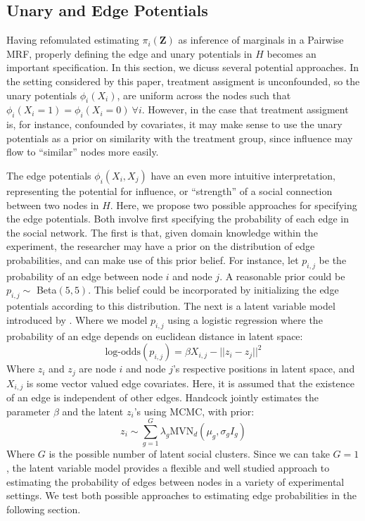 \documentclass{article}
\begin{document}
\subsection{Unary and Edge Potentials}

Having refomulated estimating $\pi_i(\mathbf{Z})$ as inference of marginals in a Pairwise MRF, 
properly defining the edge and unary potentials in $H$ becomes an important specification. In this section, 
we dicuss several potential approaches. In the setting considered by this paper, treatment assigment is unconfounded, so 
the unary potentials $\phi_i(X_i)$, are uniform across the nodes such that $\phi_i(X_i = 1) = \phi_i(X_i = 0) \ \forall i$. However, 
in the case that treatment assigment is, for instance, confounded by covariates, it may make sense to use the unary potentials as a prior on similarity 
with the treatment group, since influence may flow to ``similar'' nodes more easily. 

The edge potentials $\phi_i(X_i, X_j)$ have an even more intuitive interpretation, representing the potential for influence, or ``strength'' of a social connection between two nodes in $H$. Here, 
we propose two possible approaches for specifying the edge potentials. Both involve first specifying the probability of each edge in the social network. The first is that, given domain knowledge within the experiment, the researcher may have a prior on the distribution of 
edge probabilities, and can make use of this prior belief. For instance, let $p_{i,j}$ be the probability of an edge between node 
$i$ and node $j$. A reasonable prior could be $p_{i,j} \sim $ Beta$(5, 5)$. This belief could be incorporated by initializing the 
edge potentials according to this distribution. The next is a latent variable model introduced by \cite{Handcock}. Where we model $p_{i,j}$ using a logistic regression where the probability of an edge depends on euclidean distance in latent space: 
\begin{equation}
  \mbox{log-odds}(p_{i,j}) = \beta X_{i,j} - ||z_i - z_j||^2
\end{equation}
Where $z_i$ and $z_j$ are node $i$ and node $j$'s respective positions in latent space, and $X_{i,j}$ is some vector valued edge covariates. Here, it is assumed that the existence of an edge is independent of other edges. 
Handcock jointly estimates the parameter $\beta$ and the latent $z_i$'s using MCMC, with prior: \begin{displaymath}
  z_i \sim \sum_{g = 1}^{G}\lambda_g \mbox{MVN}_d(\mu_g, \sigma_gI_g) 
\end{displaymath}
Where $G$ is the possible number of latent social clusters. Since we can take $G = 1$, the latent variable model provides a flexible and well 
studied approach to estimating the probability of edges between nodes in a variety of experimental settings. We test both possible approaches to estimating 
edge probabilities in the following section.
\end{document}
